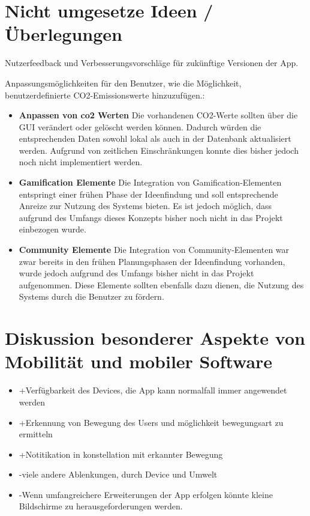 \documentclass{article}
\begin{document}
\section{Nicht umgesetze Ideen / Überlegungen}

    Nutzerfeedback und Verbesserungsvorschläge für zukünftige Versionen der App.
    
    
    Anpassungsmöglichkeiten für den Benutzer, wie die Möglichkeit, benutzerdefinierte CO2-Emissionswerte hinzuzufügen.:
    
    \begin{itemize}
    \item \textbf{Anpassen von co2 Werten}
    Die vorhandenen CO2-Werte sollten über die GUI verändert oder gelöscht werden können. Dadurch würden die entsprechenden Daten sowohl lokal als auch in der Datenbank aktualisiert werden. Aufgrund von zeitlichen Einschränkungen konnte dies bisher jedoch noch nicht implementiert werden.
    
    \item \textbf{Gamification Elemente}
    Die Integration von Gamification-Elementen entspringt einer frühen Phase der Ideenfindung und soll entsprechende Anreize zur Nutzung des Systems bieten. Es ist jedoch möglich, dass aufgrund des Umfangs dieses Konzepts bisher noch nicht in das Projekt einbezogen wurde.
    
    \item \textbf{Community Elemente}
    Die Integration von Community-Elementen war zwar bereits in den frühen Planungsphasen der Ideenfindung vorhanden, wurde jedoch aufgrund des Umfangs bisher nicht in das Projekt aufgenommen. Diese Elemente sollten ebenfalls dazu dienen, die Nutzung des Systems durch die Benutzer zu fördern.
    \end{itemize}
    
    
\section{Diskussion besonderer Aspekte von Mobilität und
mobiler Software}
\begin{itemize}
\item +Verfügbarkeit des Devices, die App kann normalfall immer angewendet werden
\item +Erkennung von Bewegung des Users und möglichkeit bewegungsart zu ermitteln
\item +Notitikation in konstellation mit erkannter Bewegung
\item -viele andere Ablenkungen, durch Device und Umwelt
\item -Wenn umfangreichere Erweiterungen der App erfolgen könnte kleine Bildschirme zu herausgeforderungen werden.
\end{itemize}
    
\end{document}
